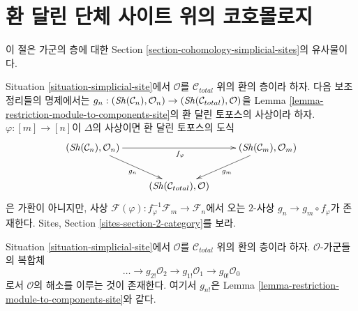 \section{환 달린 단체 사이트 위의 코호몰로지}
\label{section-cohomology-simplicial-sites-modules}

\noindent
이 절은 가군의 층에 대한
Section \ref{section-cohomology-simplicial-sites}의 유사물이다.

\medskip\noindent
Situation \ref{situation-simplicial-site}에서 $\mathcal{O}$를
$\mathcal{C}_{total}$ 위의 환의 층이라 하자.
다음 보조정리들의 명제에서는
$g_n : (\mathop{\mathit{Sh}}\nolimits(\mathcal{C}_n), \mathcal{O}_n) \to
(\mathop{\mathit{Sh}}\nolimits(\mathcal{C}_{total}), \mathcal{O})$을
Lemma \ref{lemma-restriction-module-to-components-site}의
환 달린 토포스의 사상이라 하자.
$\varphi : [m] \to [n]$이 $\Delta$의 사상이면 환 달린 토포스의 도식
$$
\xymatrix{
(\Sh(\mathcal{C}_n), \mathcal{O}_n) \ar[rd]_{g_n} \ar[rr]_{f_\varphi} & &
(\Sh(\mathcal{C}_m), \mathcal{O}_m) \ar[ld]^{g_m} \\
& (\Sh(\mathcal{C}_{total}), \mathcal{O})
}
$$
은 가환이 아니지만, 사상
$\mathcal{F}(\varphi) : f_\varphi^{-1}\mathcal{F}_m \to \mathcal{F}_n$에서
오는 $2$-사상 $g_n \to g_m \circ f_\varphi$가 존재한다.
Sites, Section \ref{sites-section-2-category}를 보라.

\begin{lemma}
\label{lemma-simplicial-resolution-ringed}
Situation \ref{situation-simplicial-site}에서 $\mathcal{O}$를
$\mathcal{C}_{total}$ 위의 환의 층이라 하자.
$\mathcal{O}$-가군들의 복합체
$$
\ldots \to g_{2!}\mathcal{O}_2 \to g_{1!}\mathcal{O}_1 \to g_{0!}\mathcal{O}_0
$$
로서 $\mathcal{O}$의 해소를 이루는 것이 존재한다.
여기서 $g_{n!}$은 Lemma
\ref{lemma-restriction-module-to-components-site}와 같다.
\end{lemma}

